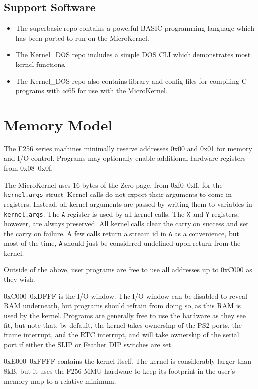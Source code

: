 \subsection*{Support Software}
\begin{itemize}
    \item The superbasic repo contains a powerful BASIC programming language which has been ported to run on the MicroKernel.
    \item The Kernel\_DOS repo includes a simple DOS CLI which demonstrates most kernel functions.
    \item The Kernel\_DOS repo also contains library and config files for compiling C programs with cc65 for use with the MicroKernel.
\end{itemize}

\section*{Memory Model}
The F256 series machines minimally reserve addresses 0x00 and 0x01 for memory and I/O control.  Programs may optionally enable additional hardware registers from 0x08--0x0f.

The MicroKernel uses 16 bytes of the Zero page, from 0xf0--0xff, for the \verb+kernel.args+ struct.  Kernel calls do not expect their arguments to come in registers.  Instead, all kernel arguments are passed by writing them to variables in \verb+kernel.args+.  The \verb+A+ register is used by all kernel calls.  The \verb+X+ and \verb+Y+ registers, however, are always preserved.  All kernel calls clear the carry on success and set the carry on failure.  A few calls return a stream id in \verb+A+ as a convenience, but most of the time, \verb+A+ should just be considered undefined upon return from the kernel.

Outside of the above, user programs are free to use all addresses up to 0xC000 as they wish.

0xC000--0xDFFF is the I/O window.  The I/O window can be disabled to reveal RAM underneath, but programs should refrain from doing so, as this RAM is used by the kernel.  Programs are generally free to use the hardware as they see fit, but note that, by default, the kernel takes ownership of the PS2 ports, the frame interrupt, and the RTC interrupt, and will take ownership of the serial port if either the SLIP or Feather DIP switches are set.

0xE000--0xFFFF contains the kernel itself.  The kernel is considerably larger than 8kB, but it uses the F256 MMU hardware to keep its footprint in the user's memory map to a relative minimum.

